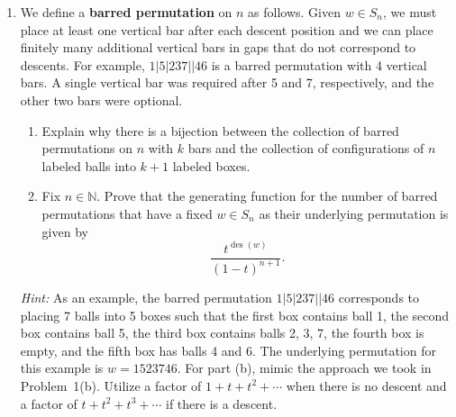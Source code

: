 \documentclass[11pt]{article}%
\theoremstyle{definition}
\DeclareMathOperator{\des}{des}
\begin{document}
\begin{enumerate}
\item We define a \textbf{barred permutation} on $n$ as follows.  Given $w\in S_n$, we must place at least one vertical bar after each descent position and we can place finitely many additional vertical bars in gaps that do not correspond to descents.  For example, $1|5|237||46$ is a barred permutation with 4 vertical bars.  A single vertical bar was required after 5 and 7, respectively, and the other two bars were optional.
\begin{enumerate}
\item Explain why there is a bijection between the collection of barred permutations on $n$ with $k$ bars and the collection of configurations of $n$ labeled balls into $k+1$ labeled boxes.
\item Fix $n\in \mathbb{N}$. Prove that the generating function for the number of barred permutations that have a fixed $w\in S_n$ as their underlying permutation is given by
\[
\frac{t^{\des(w)}}{(1-t)^{n+1}}.
\]
\end{enumerate}
\emph{Hint:} As an example, the barred permutation  $1|5|237||46$ corresponds to placing 7 balls into 5 boxes such that the first box contains ball 1, the second box contains ball 5, the third box contains balls 2, 3, 7, the fourth box is empty, and the fifth box has balls 4 and 6. The underlying permutation for this example is $w=1523746$. For part (b), mimic the approach we took in Problem~1(b).  Utilize a factor of $1+t+t^2+\cdots$ when there is no descent and a factor of $t+t^2+t^3+\cdots$ if there is a descent.

\end{enumerate}
\end{document}
